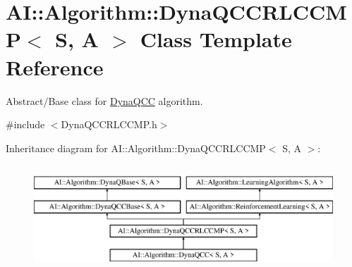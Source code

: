 \hypertarget{classAI_1_1Algorithm_1_1DynaQCCRLCCMP}{\section{A\+I\+:\+:Algorithm\+:\+:Dyna\+Q\+C\+C\+R\+L\+C\+C\+M\+P$<$ S, A $>$ Class Template Reference}
\label{classAI_1_1Algorithm_1_1DynaQCCRLCCMP}
}


Abstract/\+Base class for \hyperlink{classAI_1_1Algorithm_1_1DynaQCC}{Dyna\+Q\+C\+C} algorithm.  




{\ttfamily \#include $<$Dyna\+Q\+C\+C\+R\+L\+C\+C\+M\+P.\+h$>$}

Inheritance diagram for A\+I\+:\+:Algorithm\+:\+:Dyna\+Q\+C\+C\+R\+L\+C\+C\+M\+P$<$ S, A $>$\+:\begin{figure}[H]
\begin{center}
\leavevmode
\includegraphics[height=4.000000cm]{classAI_1_1Algorithm_1_1DynaQCCRLCCMP}
\end{center}
\end{figure}
